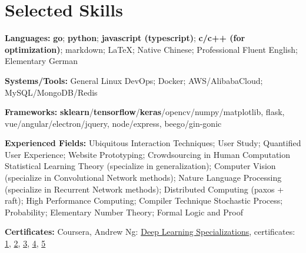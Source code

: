 \section{\textbf{Selected Skills}}
\resumeSubHeadingListStart
\item{
  \textbf{Languages:}{ \textbf{go}; \textbf{python}; \textbf{javascript (typescript)}; \textbf{c/c++ (for optimization)}; markdown; \LaTeX; Native Chinese; Professional Fluent English; Elementary German}
}
\item{
 \textbf{Systems/Tools:}{ General Linux DevOps; Docker; AWS/AlibabaCloud; MySQL/MongoDB/Redis}
}
\item{
 \textbf{Frameworks:}{ \textbf{sklearn}/\textbf{tensorflow}/\textbf{keras}/opencv/numpy/matplotlib, flask, vue/angular/electron/jquery, node/express, beego/gin-gonic}
}
\item{
  \textbf{Experienced Fields:}{ 
    \resumeItemListStart
       { Ubiquitous Interaction Techniques; User Study; Quantified User Experience; Website Prototyping; Crowdsourcing in Human Computation}
       { Statistical Learning Theory (specialize in generalization); Computer Vision (specialize in Convolutional Network methods); Nature Language Processing (specialize in Recurrent Network methods); Distributed Computing (paxos + raft); High Performance Computing; Compiler Technique}
       { Stochastic Process; Probability; Elementary Number Theory; Formal Logic and Proof}
   \resumeItemListEnd
  }
}
\item{
 \textbf{Certificates:}{
  Coursera, Andrew Ng: \href{https://www.coursera.org/account/accomplishments/specialization/QGH8ZVJ6J2L2}{Deep Learning Specializations}, certificates:
  \href{https://www.coursera.org/account/accomplishments/verify/YH4NT7HHN263}{1}, 
  \href{https://www.coursera.org/account/accomplishments/verify/QGH3GNGF6BM4}{2}, 
  \href{https://www.coursera.org/account/accomplishments/verify/6VU45R2SZEF6}{3},
  \href{https://www.coursera.org/account/accomplishments/verify/LF3K9BQQDLVL}{4},
  \href{https://www.coursera.org/account/accomplishments/verify/JQFLW2DPYAGW}{5}
 }
}
\resumeSubHeadingListEnd